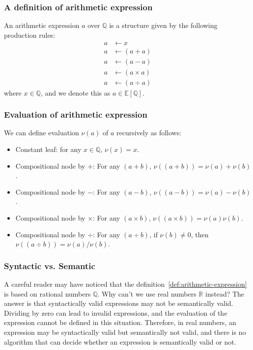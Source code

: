 \documentclass[aspectratio=169]{beamer}
\begin{document}
\begin{frame}
\frametitle{A definition of arithmetic expression}
\begin{definition}\label{def:arithmetic-expression}
    An arithmetic expression $a$ over $\mathbb{Q}$ is a structure given by the following production rules:
\begin{equation}\label{eq:productionrule}
\begin{aligned}
a &\longleftarrow x\\
a &\longleftarrow ( a + a )\\
a &\longleftarrow ( a - a )\\
a &\longleftarrow ( a \times a )\\
a &\longleftarrow ( a \div a )
\end{aligned}
\end{equation}
    where $x \in \mathbb{Q}$, and we denote this as $a \in \mathbb{E} \left [\mathbb{Q} \right ]$.
\end{definition}
\end{frame}

\begin{frame}
\frametitle{Evaluation of arithmetic expression}
We can define evaluation $\nu(a)$ of $a$ recursively as follows:
\begin{itemize}
  \item Constant leaf: for any $x \in \mathbb{Q}$, $\nu(x) = x$.
  \item Compositional node by $+$: For any $(a + b)$, $\nu((a + b)) = \nu(a) + \nu(b)$.
  \item Compositional node by $-$: For any $(a - b)$, $\nu((a - b)) = \nu(a) - \nu(b)$.
  \item Compositional node by $\times$: For any $(a \times b)$, $\nu((a \times b)) = \nu(a) \nu(b)$.
  \item Compositional node by $\div$: For any $(a \div b)$, if $\nu(b) \neq 0$, then $\nu((a \div b)) = \nu(a) / \nu(b)$.
\end{itemize}
\end{frame}

\begin{frame}
\frametitle{Syntactic vs. Semantic}
A careful reader may have noticed that the definition~\ref{def:arithmetic-expression} is based on rational numbers $\mathbb{Q}$.
Why can't we use real numbers $\mathbb{R}$ instead?
The answer is that syntactically valid expressions may not be semantically valid.
Dividing by zero can lead to invalid expressions, and the evaluation of the expression cannot be defined in this situation.
Therefore, in real numbers, an expression may be syntactically valid but semantically not valid,
and there is no algorithm that can decide whether an expression is semantically valid or not.
\end{frame}
\end{document}
